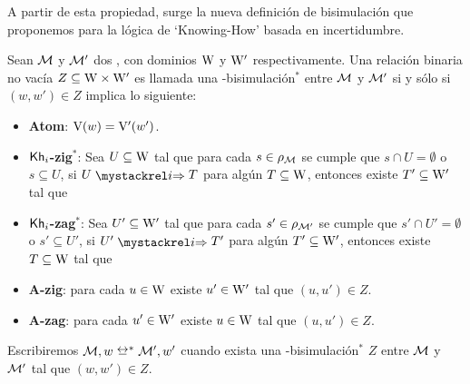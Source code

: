 A partir de esta propiedad, surge la nueva definición de bisimulación que proponemos para la lógica de `Knowing-How' basada en 
incertidumbre.

\begin{definicion}\label{def:bisim-redefinition}
    Sean $\mathcal{M}$ y $\mathcal{M}'$ dos \ultss, con dominios $\mathrm{W}$ y $\mathrm{W}'$ respectivamente.
    Una relación binaria no vacía $Z \subseteq \mathrm{W} \times \mathrm{W}'$ es llamada una \KHilogic-bisimulación$^*$ entre $\mathcal{M}$ y 
    $\mathcal{M}'$ si y sólo si $(w,w') \in Z$ implica lo siguiente:
    \begin{itemize}
        \item \textbf{Atom}: $\mathrm{V}(w)=\mathrm{V}'(w')$.

        \item \textbf{$\mathsf{Kh}_i$-zig$^*$}: Sea $U \subseteq \mathrm{W}$ tal que para cada $s \in \rho_{\mathcal{M}}$ se cumple que $s \cap U = \emptyset$ o $s \subseteq U$, si $U \ultsExecAgi T$ para algún $T \subseteq \mathrm{W}$, entonces existe $T' \subseteq \mathrm{W}'$ tal que
        \begin{multicols}{2}
        \end{multicols}
        
        \item \textbf{$\mathsf{Kh}_i$-zag$^*$}: Sea $U' \subseteq \mathrm{W}'$ tal que para cada $s' \in \rho_{\mathcal{M}'}$ se cumple que $s' \cap U' = \emptyset$ o $s' \subseteq U'$, si $U' \ultsExecAgi T'$ para algún $T' \subseteq \mathrm{W}'$, entonces existe $T \subseteq \mathrm{W}$ tal que
        \begin{multicols}{2}
        \end{multicols}

        \item \textbf{A-zig}: para cada $u \in \mathrm{W}$ existe $u' \in \mathrm{W}'$ tal que $(u,u') \in Z$.

        \item \textbf{A-zag}: para cada $u' \in \mathrm{W}'$ existe $u \in \mathrm{W}$ tal que $(u,u') \in Z$.
    \end{itemize} 

    Escribiremos $\modults,w \bisim^* \modults',w'$ cuando exista una \KHilogic-bisimulación$^*$ $Z$ entre
    $\mathcal{M}$ y $\mathcal{M}'$ tal que $(w,w') \in Z$.
\end{definicion}


